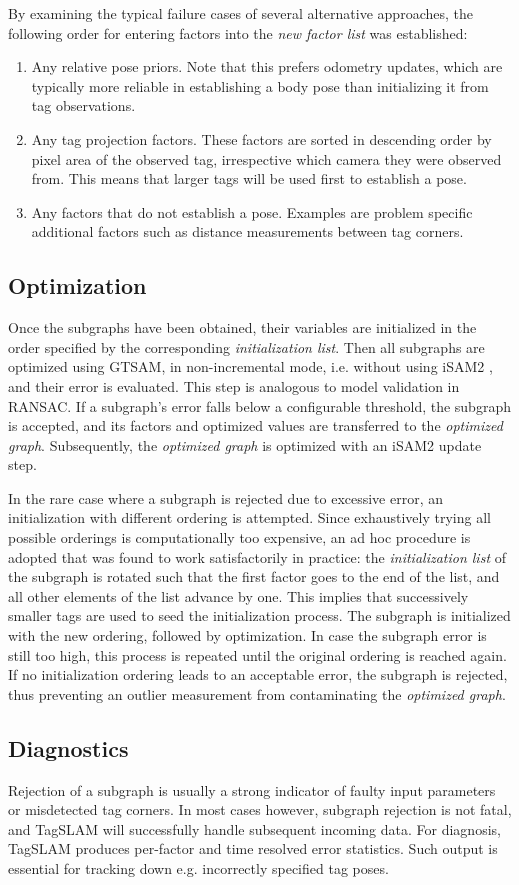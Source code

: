 By examining the typical failure cases of several alternative
approaches, the following order for entering factors into the {\em new
  factor list} was established:
\begin{enumerate}[wide, labelwidth=!]
\item Any relative pose priors. Note that this prefers odometry
  updates, which are typically more reliable in establishing a body
  pose than initializing it from tag observations.
\item Any tag projection factors. These factors are sorted in
  descending order by pixel area of the observed tag, irrespective
  which camera they were observed from. This means that larger tags
  will be used first to establish a pose.
\item Any factors that do not establish a pose. Examples are problem
  specific additional factors such as distance measurements between
  tag corners.
\end{enumerate}

\subsection{Optimization}
Once the subgraphs have been obtained, their variables are initialized
in the order specified by the corresponding {\em initialization
  list}. Then all subgraphs are optimized using GTSAM, in
non-incremental mode, i.e. without using iSAM2 \cite{kaess2011}, and
their error is evaluated. This step is analogous to model validation
in RANSAC. If a subgraph's error falls below a
configurable threshold, the subgraph is accepted, and its factors and
optimized values are transferred to the {\em optimized
  graph}. Subsequently, the {\em optimized graph} is optimized with an
iSAM2 update step.

In the rare case where a subgraph is rejected due to excessive error,
an initialization with different ordering is attempted. Since
exhaustively trying all possible orderings is computationally too
expensive, an ad hoc procedure is adopted that was found to work
satisfactorily in practice: the {\em initialization list} of the
subgraph is rotated such that the first factor goes to the end of the
list, and all other elements of the list advance by one. This implies
that successively smaller tags are used to seed the initialization
process. The subgraph is initialized with the new ordering, followed
by optimization. In case the subgraph error is still too high, this
process is repeated until the original ordering is reached again. If
no initialization ordering leads to an acceptable error, the subgraph
is rejected, thus preventing an outlier measurement from contaminating
the {\em optimized graph}.

\subsection{Diagnostics}
Rejection of a subgraph is usually a strong indicator of faulty input
parameters or misdetected tag corners. In most cases however, subgraph
rejection is not fatal, and TagSLAM will successfully handle
subsequent incoming data. For diagnosis, TagSLAM produces per-factor
and time resolved error statistics. Such output is essential for
tracking down e.g. incorrectly specified tag poses.
